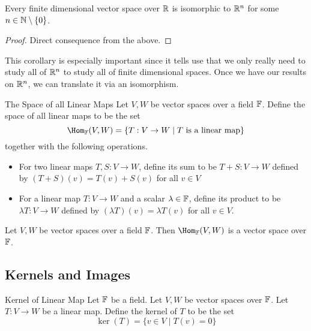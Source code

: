 \documentclass[a4paper]{article}
\begin{document}
\begin{crl}{}{} Every finite dimensional vector space over $\mathbb{R}$ is isomorphic to $\mathbb{R}^n$ for some $n\in\mathbb{N}\setminus\{0\}$. 
\begin{proof} Direct consequence from the above. 
\end{proof}
\end{crl}

This corollary is especially important since it tells use that we only really need to study all of $\mathbb{R}^n$ to study all of finite dimensional spaces. Once we have our results on $\mathbb{R}^n$, we can translate it via an isomorphism. 

\begin{defn}{The Space of all Linear Maps}{} Let $V,W$ be vector spaces over a field $\mathbb{F}$. Define the space of all linear maps to be the set $$\Hom_\F(V,W)=\{T:V\to W\;|\;T\text{ is a linear map}\}$$ together with the following operations. 
\begin{itemize}
\item For two linear maps $T,S:V\to W$, define its sum to be $T+S:V\to W$ defined by $(T+S)(v)=T(v)+S(v)$ for all $v\in V$
\item For a linear map $T:V\to W$ and a scalar $\lambda\in\mathbb{F}$, define its product to be $\lambda T:V\to W$ defined by $(\lambda T)(v)=\lambda T(v)$ for all $v\in V$. 
\end{itemize}
\end{defn}

\begin{lmm}{}{} Let $V,W$ be vector spaces over a field $\mathbb{F}$. Then $\Hom_\F(V,W)$ is a vector space over $\mathbb{F}$. 
\end{lmm}

\subsection{Kernels and Images}
\begin{defn}{Kernel of Linear Map}{} Let $\mathbb{F}$ be a field. Let $V,W$ be vector spaces over $\mathbb{F}$. Let $T:V\to W$ be a linear map. Define the kernel of $T$ to be the set $$\ker(T)=\{v\in V\;|\;T(v)=0\}$$
\end{defn}
\end{document}
